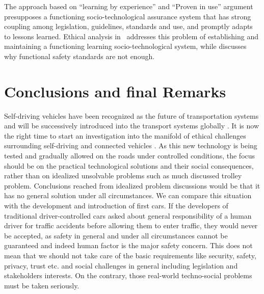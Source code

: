 The approach based on \enquote{learning by experience} and \enquote{Proven in use} argument \cite{GovernmentNL2017,NationalInstruments2014a,DBLP:journals/corr/SchabeB15} presupposes a functioning socio-technological assurance system that has strong coupling among legislation, guidelines, standards and use, and promptly adapts to lessons learned. Ethical analysis in~\cite{DodigCrnkovic2012, Thekkilakattil_7273594,Johnsen2017_7958474} addresses this problem of establishing and maintaining a functioning learning socio-technological system, while \cite{Johnsen2017_7958474} discusses why functional safety standards are not enough.



\section{Conclusions and final Remarks}
\label{sec:Conclusions}
Self-driving vehicles have been recognized as the future of transportation systems and will be successively introduced into the transport systems globally \cite{EthicsCommission2017pr,Pillath2016,NHTSA2016PolicyUpdate}. It is now the right time to start an investigation into the manifold of ethical challenges surrounding self-driving and connected vehicles \cite{EthicsCommission2017b}. As this new technology is being tested and gradually allowed on the roads under controlled conditions, the focus should be on the practical technological solutions and their social consequences, rather than on idealized unsolvable problems such as much discussed trolley problem. Conclusions reached from idealized problem discussions would be that it has no general solution under all circumstances. We can compare this situation with the development and introduction of first cars. If the developers of traditional driver-controlled cars asked about general responsibility of a human driver for traffic accidents before allowing them to enter traffic, they would never be accepted, as safety in general and under all circumstances cannot be guaranteed and indeed human factor is the major safety concern. This does not mean that we should not take care of the basic requirements like security, safety, privacy, trust etc. and social challenges in general including legislation and stakeholders interests. On the contrary, those real-world techno-social problems must be taken seriously.


